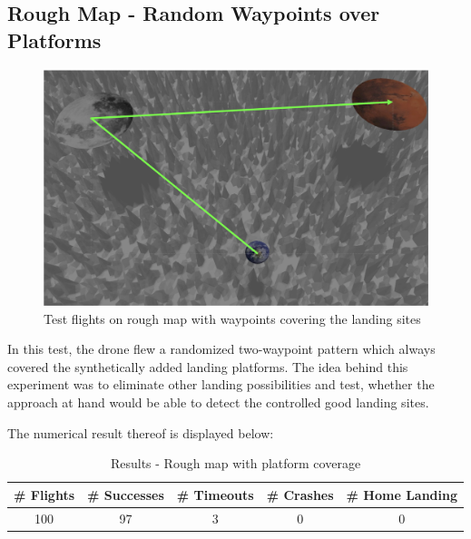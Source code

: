 \subsection{Rough Map - Random Waypoints over Platforms}\label{subsec:rough_coverage}
        \begin{figure}[h]
            \centering
            \includegraphics[scale=0.24]{images/evaluation/rough_over_platforms.png}
            \caption{Test flights on rough map with waypoints covering the landing sites}
            \label{fig:rough_covered}
        \end{figure}

        In this test, the drone flew a randomized two-waypoint pattern which always covered the synthetically added landing platforms. The idea behind this experiment was to eliminate other landing possibilities and test, whether the approach at hand would be able to detect the controlled good landing sites.

        The numerical result thereof is displayed below:

        \begin{table}[h]
            \begin{center}
             \caption{Results - Rough map with platform coverage}\vspace{1ex}
             \label{tab:result_rough_covered}
             \begin{tabular}{|c|c|c|c|c|}
             \hline
             \# Flights & \# Successes & \# Timeouts & \# Crashes & \# Home Landing\\ \hline \hline
             100 & 97 & 3 & 0 & 0 \\%
             \hline
             \end{tabular}
            \end{center}
        \end{table}

